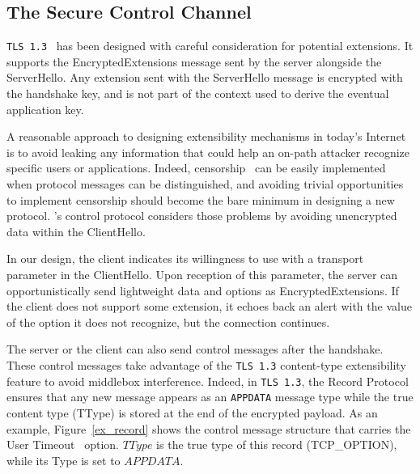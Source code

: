 
\subsection{The Secure Control Channel}\label{sec:extending}

\texttt{TLS 1.3}~\cite{rfc8446} has been designed with careful consideration for
potential extensions. It supports the EncryptedExtensions message sent by the
server alongside the ServerHello. Any extension sent with the ServerHello
message is
encrypted with the handshake key, and is not part of the context used
to derive the eventual application key.

A reasonable approach to designing extensibility mechanisms in today's
Internet is to avoid leaking any information that could help an
on-path attacker recognize specific users or applications.
Indeed, censorship~\cite{Morshed2017a, Gosain2017a,Chai2019a} can be easily implemented when protocol messages
can be distinguished, and avoiding trivial
opportunities to implement censorship should become the bare minimum in
designing a new protocol. \tcpls's control protocol considers those problems by
avoiding unencrypted data within the ClientHello.

In our design, the client indicates its willingness to use \tcpls
with a transport parameter in the ClientHello. Upon reception of this parameter,
the server can
opportunistically send lightweight \tcpls data and \tcp options as
EncryptedExtensions. If the client does not support some extension, it
echoes back an alert with the value of the option it does not recognize, but
the connection continues.

The server or the client can also send \tcpls control messages
after the handshake. These control messages
take advantage of the \texttt{TLS 1.3} content-type extensibility feature
to avoid
middlebox interference. Indeed, in \texttt{TLS 1.3}, the Record Protocol
ensures that any new message appears as an \texttt{APPDATA} message type
while the true content type (TType) is stored at the end of the encrypted payload.
As an example, Figure~\ref{ex_record}
shows the \tcpls control message structure that carries the
\tcp User Timeout~\cite{rfc5482} option. $TType$ is the true type of this
record (TCP\_OPTION), while its  Type is set to $APPDATA$.

